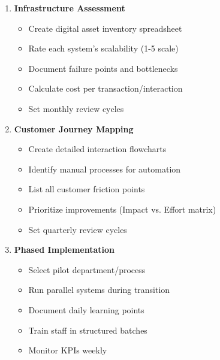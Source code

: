 \begin{tcolorbox}[colback=white,colframe=primarydark,title=\textbf{Digital Acceleration: Implementation Steps}]
\begin{enumerate}
    \item \textbf{Infrastructure Assessment}
    \begin{itemize}
        \item Create digital asset inventory spreadsheet
        \item Rate each system's scalability (1-5 scale)
        \item Document failure points and bottlenecks
        \item Calculate cost per transaction/interaction
        \item Set monthly review cycles
    \end{itemize}

    \item \textbf{Customer Journey Mapping}
    \begin{itemize}
        \item Create detailed interaction flowcharts
        \item Identify manual processes for automation
        \item List all customer friction points
        \item Prioritize improvements (Impact vs. Effort matrix)
        \item Set quarterly review cycles
    \end{itemize}

    \item \textbf{Phased Implementation}
    \begin{itemize}
        \item Select pilot department/process
        \item Run parallel systems during transition
        \item Document daily learning points
        \item Train staff in structured batches
        \item Monitor KPIs weekly
    \end{itemize}
\end{enumerate}
\end{tcolorbox}

